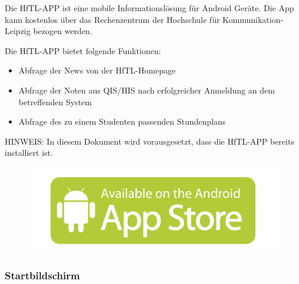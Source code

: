 Die HfTL-APP ist eine mobile Informationslösung für Android Geräte. Die App kann kostenlos über das Rechenzentrum der Hochschule für Kommunikation-Leipzig bezogen werden.

Die HfTL-APP bietet folgende Funktionen:

\begin{itemize}
\item Abfrage der News von der HfTL-Homepage
\item Abfrage der Noten aus QIS/HIS nach erfolgreicher Anmeldung an dem betreffenden System
\item Abfrage des zu einem Studenten passenden Stundenplans
\end{itemize}

HINWEIS: In diesem Dokument wird vorausgesetzt, dass die HfTL-APP bereits installiert ist.
\begin{figure}[h]
	\centering
	\includegraphics[scale=0.5]{03_Bedienungsanleitung/img/appstore.jpg}
	\label{img:grafik-dummy}
\end{figure}

\newpage

\subsubsection{Startbildschirm}


